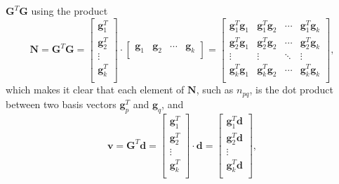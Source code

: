 $\mathbf{G}^T\mathbf{G}$ using the product
\begin{equation}
\mathbf{N} = \mathbf{G}^T\mathbf{G} = \left [
	\begin{array}{c}
	\mathbf{g}_1^T \\[6pt]
	\mathbf{g}_2^T \\[6pt]
	\vdots \\[6pt]
	\mathbf{g}_k^T \\	 
	\end{array} \right ] \cdot
	\left [
		\begin{array}{cccc}
		\mathbf{g}_1 & \mathbf{g}_2 & \cdots & \mathbf{g}_k \\	 
		\end{array}
	\right ] =
	 \left [
	\begin{array}{cccc}
	\mathbf{g}_1^T\mathbf{g}_1 & \mathbf{g}_1^T\mathbf{g}_2 & \cdots & \mathbf{g}_1^T\mathbf{g}_k \\[6pt]	 
	\mathbf{g}_2^T\mathbf{g}_1 & \mathbf{g}_2^T\mathbf{g}_2 & \cdots & \mathbf{g}_2^T\mathbf{g}_k \\[6pt]	 
	\vdots & \vdots & \ddots & \vdots \\[6pt]
	\mathbf{g}_k^T\mathbf{g}_1 & \mathbf{g}_k^T\mathbf{g}_2 & \cdots & \mathbf{g}_k^T\mathbf{g}_k \\	 
	\end{array} \right ],
	\label{eq:gdotg}
\end{equation}
which makes it clear that each element of $\mathbf{N}$, such as $n_{pq}$, is the dot product between two basis vectors $\mathbf{g}_p^T$ and $\mathbf{g}_q$, and
\begin{equation}
\mathbf{v} = \mathbf{G}^T\mathbf{d} = \left [
	\begin{array}{c}
	\mathbf{g}_1^T \\[6pt]
	\mathbf{g}_2^T \\[6pt]
	\vdots \\[6pt]
	\mathbf{g}_k^T \\	 
	\end{array} \right ] \cdot \mathbf{d} =
	 \left [
	\begin{array}{c}
	\mathbf{g}_1^T\mathbf{d} \\[6pt]	 
	\mathbf{g}_2^T\mathbf{d}  \\[6pt]	 
	\vdots \\[6pt]
	\mathbf{g}_k^T\mathbf{d} \\	 
	\end{array} \right ],
	\label{eq:gdotd}
\end{equation}

